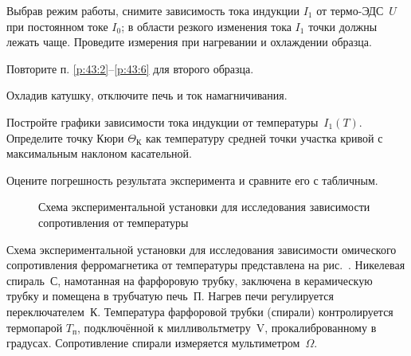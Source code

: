 \begin{lab:task}
\item \label{p:43:6}
  Выбрав режим работы, снимите зависимость тока индукции $I_1$ от термо-ЭДС~$U$
при постоянном токе $I_0$; в области резкого изменения тока $I_1$ точки 
должны лежать чаще. Проведите измерения при нагревании и охлаждении образца.

\item Повторите п. \ref{p:43:2}--\ref{p:43:6} для второго образца.
\item Охладив катушку, отключите печь и ток намагничивания.


\item Постройте графики зависимости тока индукции от температуры~$I_1(T)$. 
Определите точку Кюри $\Theta_{К}$ как температуру средней точки участка
кривой с максимальным наклоном касательной.



\item Оцените погрешность результата эксперимента и сравните его с табличным.

\end{lab:task}


\experiment

\begin{figure}[h!]
\centering
	\caption{Схема экспериментальной установки для исследования
	зависимости сопротивления от температуры}
\end{figure}
Схема экспериментальной установки для исследования зависимости омического
сопротивления ферромагнетика от температуры представлена на
рис.~. 
Никелевая спираль~С, намотанная на фарфоровую трубку, 
заключена в керамическую трубку и помещена в трубчатую печь~П. 
Нагрев печи регулируется переключателем~К. Температура фарфоровой трубки 
(спирали) контролируется термопарой $T_{\text{п}}$, подключённой к 
милливольтметру~V, прокалиброванному в градусах. Сопротивление
спирали измеряется мультиметром~$\Omega$.


